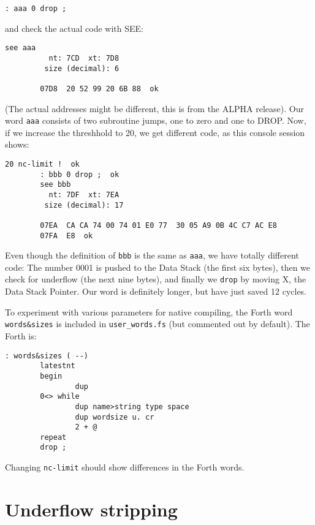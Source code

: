 \begin{lstlisting}[frame=single]
        : aaa 0 drop ;
\end{lstlisting}

and check the actual code with SEE:

\begin{lstlisting}[frame=single]
        see aaa
          nt: 7CD  xt: 7D8
         size (decimal): 6

        07D8  20 52 99 20 6B 88  ok
\end{lstlisting}

(The actual addresses might be different, this is from the ALPHA release).
Our word \texttt{aaa} consists of two subroutine jumps, one to zero and one to DROP.
Now, if we increase the threshhold to 20, we get different code, as this
console session shows:

\begin{lstlisting}[frame=single]
        20 nc-limit !  ok
        : bbb 0 drop ;  ok
        see bbb
          nt: 7DF  xt: 7EA
         size (decimal): 17

        07EA  CA CA 74 00 74 01 E0 77  30 05 A9 0B 4C C7 AC E8
        07FA  E8  ok
\end{lstlisting}

Even though the definition of \texttt{bbb} is the same as \texttt{aaa}, we have
totally different code: The number 0001 is pushed to the Data Stack (the first
six bytes), then we check for underflow (the next nine bytes), and finally we
\texttt{drop} by moving X, the Data Stack Pointer. Our word is definitely longer, but
have just saved 12 cycles.

To experiment with various parameters for native compiling, the Forth word
\texttt{words\&sizes} is included in \texttt{user\_words.fs} (but commented out 
by default). The Forth is:

\begin{lstlisting}[frame=single]
: words&sizes ( --)
        latestnt
        begin
                dup
        0<> while
                dup name>string type space
                dup wordsize u. cr      
                2 + @
        repeat
        drop ;
\end{lstlisting}

Changing \texttt{nc-limit} should show differences in the Forth words.



\section{Underflow stripping}

